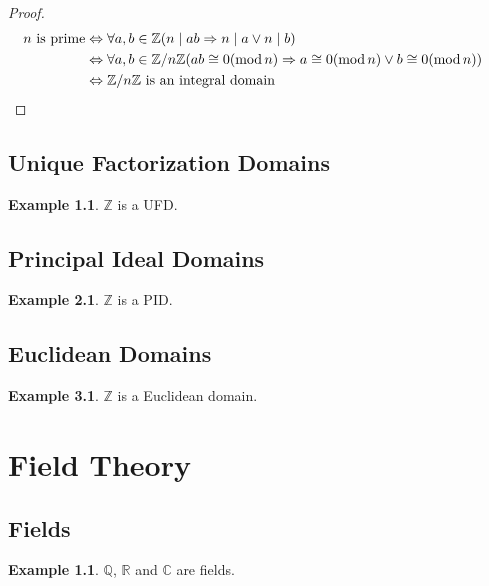 \documentclass{book}
\let\qed\relax
\theoremstyle{definition}
\newtheorem{ex}[prop]{Example}
\renewcommand{\mod}{\ensuremath{\operatorname{mod}}}
\begin{document}
\begin{proof}
\pf
\begin{align*}
n \text{ is prime} & \Leftrightarrow \forall a,b \in \mathbb{Z} (n \mid a b \Rightarrow n \mid a \vee n \mid b) \\
& \Leftrightarrow \forall a,b \in \mathbb{Z} / n \mathbb{Z} (ab \cong 0 (\mod n) \Rightarrow a \cong 0 (\mod n) \vee b \cong 0 (\mod n)) \\
& \Leftrightarrow \mathbb{Z} / n \mathbb{Z} \text{ is an integral domain} & \qed
\end{align*}
\end{proof}

\chapter{Unique Factorization Domains}


\begin{ex}
$\mathbb{Z}$ is a UFD.
\end{ex}

\chapter{Principal Ideal Domains}


\begin{ex}
$\mathbb{Z}$ is a PID.
\end{ex}

\chapter{Euclidean Domains}


\begin{ex}
$\mathbb{Z}$ is a Euclidean domain.
\end{ex}

\part{Field Theory}

\chapter{Fields}


\begin{ex}
$\mathbb{Q}$, $\mathbb{R}$ and $\mathbb{C}$ are fields.
\end{ex}
\end{document}
